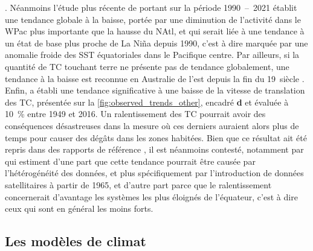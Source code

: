\documentclass[../main.tex]{subfiles}
\begin{document}
\parencite{webster_changes_2005,maue_recent_2011,wang_climate_2010,seneviratne_weather_2021}. Néanmoins l'étude plus récente de \cite{klotzbach_trends_2022}
portant sur la période \num{1990}~--~\num{2021} établit une tendance globale à la baisse, portée par une diminution de l'activité dans le WPac plus importante
que la hausse du NAtl, et qui serait liée à une tendance à un état de base plus proche de La Niña depuis \num{1990}, c'est à dire marquée par une anomalie
froide des SST équatoriales dans le Pacifique centre. Par ailleurs, si la quantité de TC touchant terre ne présente pas de tendance globalement, une tendance à
la baisse est reconnue en Australie de l'est depuis la fin du \num{19}\ieme~siècle \parencite{knutson_tropical_2019,callaghan_variability_2011}. Enfin,
\cite{kossin_global_2018,kossin_reply_2019} a établi une tendance significative à une baisse de la vitesse de translation des TC, présentée sur la
\cref{fig:observed_trends_other}, encadré \textbf{d} et évaluée à \SI{10}{\percent} entre \num{1949} et \num{2016}. Un ralentissement des TC pourrait avoir des
conséquences désastreuses dans la mesure où ces derniers auraient alors plus de temps pour causer des dégâts dans les zones habitées. Bien que ce résultat ait
été repris dans des rapports de référence \parencite{knutson_tropical_2019,seneviratne_weather_2021}, il est néanmoins contesté, notamment par
\cite{lanzante_uncertainties_2019,moon_climate_2019} qui estiment d'une part que cette tendance pourrait être causée par l'hétérogénéité des données, et
plus spécifiquement par l'introduction de données satellitaires à partir de \num{1965}, et d'autre part parce que le ralentissement concernerait d'avantage les
systèmes les plus éloignés de l'équateur, c'est à dire ceux qui sont en général les moins forts.

\subsection{Les modèles de climat}\label{sec:modèles}
\end{document}
